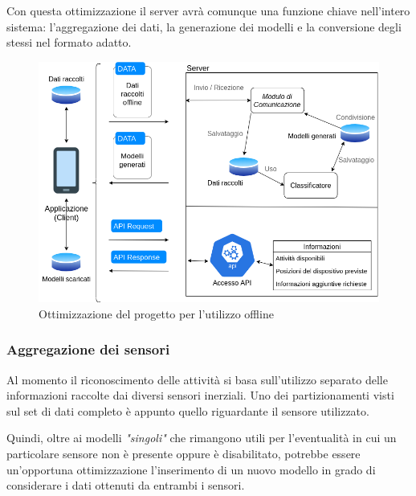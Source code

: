 \vspace{5mm} %
Con questa ottimizzazione il server avrà comunque una funzione chiave nell'intero sistema: l'aggregazione dei dati, la 
generazione dei modelli e la conversione degli stessi nel formato adatto.

\begin{figure}[H]
    \centering
    \includegraphics[scale = 0.56]{assets/images/future/offline.png}
    \caption{Ottimizzazione del progetto per l'utilizzo offline}
    \label{fig:overview}
\end{figure}

\subsubsection{Aggregazione dei sensori}
Al momento il riconoscimento delle attività si basa sull'utilizzo separato delle informazioni raccolte dai diversi sensori inerziali.
Uno dei partizionamenti visti sul set di dati completo è appunto quello riguardante il sensore utilizzato.

\vspace{5mm} %

Quindi, oltre ai modelli \textit{"singoli"} che rimangono utili per l'eventualità in cui un particolare sensore non è presente oppure è disabilitato, 
potrebbe essere un'opportuna ottimizzazione l'inserimento di un nuovo modello in grado di considerare i dati ottenuti da entrambi 
i sensori.
